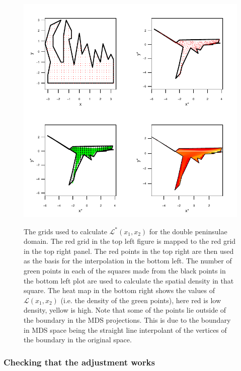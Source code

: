 \begin{figure}
\centering
\includegraphics{mds/figs/densgrid.pdf} \\
\caption{The grids used to calculate $\mathcal{L}^*(x_1,x_2)$ for the double peninsulae domain. The red grid in the top left figure is mapped to the red grid in the top right panel. The red points in the top right are then used as the basis for the interpolation in the bottom left. The number of green points in each of the squares made from the black points in the bottom left plot are used to calculate the spatial density in that square. The heat map in the bottom right shows the values of $\mathcal{L}(x_1,x_2)$ (i.e. the density of the green points), here red is low density, yellow is high. Note that some of the points lie outside of the boundary in the MDS projections. This is due to the boundary in MDS space being the straight line interpolant of the vertices of the boundary in the original space.}
\label{densgrid}
\end{figure}

\subsubsection{Checking that the adjustment works}

